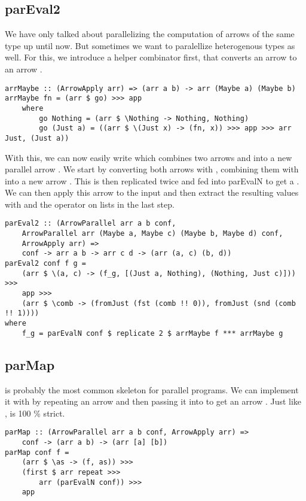 \subsection{parEval2}
We have only talked about parallelizing the computation of arrows of the same type up until now. But sometimes we want to paralellize heterogenous types as well. For this, we introduce a helper combinator  first, that converts an arrow  to an arrow .
\begin{lstlisting}[frame=htrbl]
arrMaybe :: (ArrowApply arr) => (arr a b) -> arr (Maybe a) (Maybe b)
arrMaybe fn = (arr $ go) >>> app
	where 
		go Nothing = (arr $ \Nothing -> Nothing, Nothing)
		go (Just a) = ((arr $ \(Just x) -> (fn, x)) >>> app >>> arr Just, (Just a))
\end{lstlisting}
With this, we can now easily write  which combines two arrows  and  into a new parallel arrow . We start by converting both arrows with , combining them with \code{***} into a new arrow . This is then replicated twice and fed into parEvalN to get a . We can then apply this arrow to the input  and then extract the resulting values with  and the \code{!!} operator on lists in the last step.
\begin{lstlisting}[frame=htrbl]
parEval2 :: (ArrowParallel arr a b conf,
	ArrowParallel arr (Maybe a, Maybe c) (Maybe b, Maybe d) conf,
	ArrowApply arr) =>
	conf -> arr a b -> arr c d -> (arr (a, c) (b, d))
parEval2 conf f g =
	(arr $ \(a, c) -> (f_g, [(Just a, Nothing), (Nothing, Just c)])) >>>
	app >>>
	(arr $ \comb -> (fromJust (fst (comb !! 0)), fromJust (snd (comb !! 1))))
where
	f_g = parEvalN conf $ replicate 2 $ arrMaybe f *** arrMaybe g
\end{lstlisting}

\subsection{parMap}
 is probably the most common skeleton for parallel programs. We can implement it with  by repeating an arrow  and then passing it into  to get an arrow . 
Just like ,  is 100 \% strict.
\begin{lstlisting}[frame=htrbl]
parMap :: (ArrowParallel arr a b conf, ArrowApply arr) =>
	conf -> (arr a b) -> (arr [a] [b])
parMap conf f =
	(arr $ \as -> (f, as)) >>>
	(first $ arr repeat >>>
		arr (parEvalN conf)) >>>
	app
\end{lstlisting}

